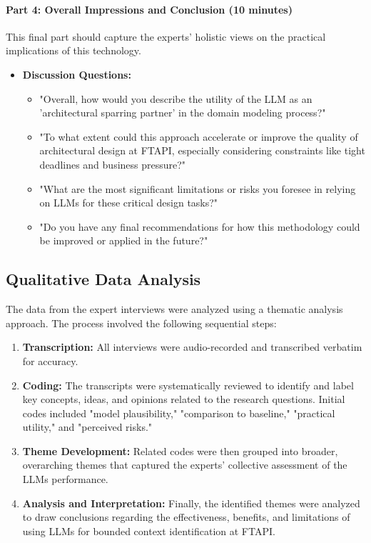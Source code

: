 \paragraph{Part 4: Overall Impressions and Conclusion (10 minutes)}
This final part should capture the experts' holistic views on the practical implications of this technology.

\begin{itemize}
    \item \textbf{Discussion Questions:}
    \begin{itemize}
        \item "Overall, how would you describe the utility of the LLM as an 'architectural sparring partner' in the domain modeling process?"
        \item "To what extent could this approach accelerate or improve the quality of architectural design at FTAPI, especially considering constraints like tight deadlines and business pressure?"
        \item "What are the most significant limitations or risks you foresee in relying on LLMs for these critical design tasks?"
        \item "Do you have any final recommendations for how this methodology could be improved or applied in the future?"
    \end{itemize}
\end{itemize}

\subsection{Qualitative Data Analysis}
The data from the expert interviews were analyzed using a thematic analysis approach. The process involved the following sequential steps:

\begin{enumerate}[label=\arabic*., wide, labelwidth=!, labelindent=0pt, topsep=4pt, itemsep=2pt]
    \item \textbf{Transcription:} All interviews were audio-recorded and transcribed verbatim for accuracy.
    
    \item \textbf{Coding:} The transcripts were systematically reviewed to identify and label key concepts, ideas, and opinions related to the research questions. Initial codes included "model plausibility," "comparison to baseline," "practical utility," and "perceived risks."
    
    \item \textbf{Theme Development:} Related codes were then grouped into broader, overarching themes that captured the experts' collective assessment of the LLMs performance.
    
    \item \textbf{Analysis and Interpretation:} Finally, the identified themes were analyzed to draw conclusions regarding the effectiveness, benefits, and limitations of using LLMs for bounded context identification at FTAPI.
\end{enumerate}